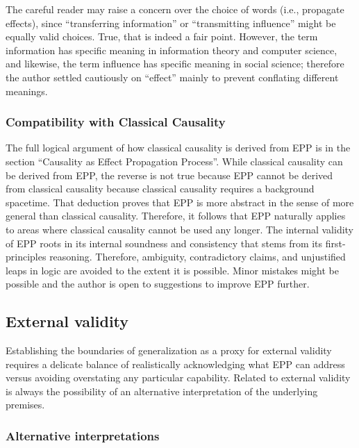 The careful reader may raise a concern over the choice of words (i.e., propagate effects), since “transferring information” or “transmitting influence” might be equally valid choices. True, that is indeed a fair point. However, the term information has specific meaning in information theory and computer science, and likewise, the term influence has specific meaning in social science; therefore the author settled cautiously on “effect” mainly to prevent conflating different meanings.

\subsubsection{Compatibility with Classical Causality}

The full logical argument of how classical causality is derived from EPP is in the section “Causality as Effect Propagation Process”.
While classical causality can be derived from EPP, the reverse is not true because EPP cannot be derived from classical causality because classical causality requires a background spacetime. That deduction proves that EPP is more abstract in the sense of more general than classical causality. Therefore, it follows that EPP naturally applies to areas where classical causality cannot be used any longer. The internal validity of EPP roots in its internal soundness and consistency that stems from its first-principles reasoning. Therefore, ambiguity, contradictory claims, and unjustified leaps in logic are avoided to the extent it is possible. Minor mistakes might be possible and the author is open to suggestions  to improve EPP further.

\newpage

\subsection{External validity}
\label{sec:validity_external}

Establishing the boundaries of generalization as a proxy for external validity requires a delicate balance of realistically acknowledging what EPP can address versus avoiding overstating  any particular capability. Related to external validity is always the possibility of an alternative interpretation of the underlying premises.

\subsubsection{Alternative interpretations}


